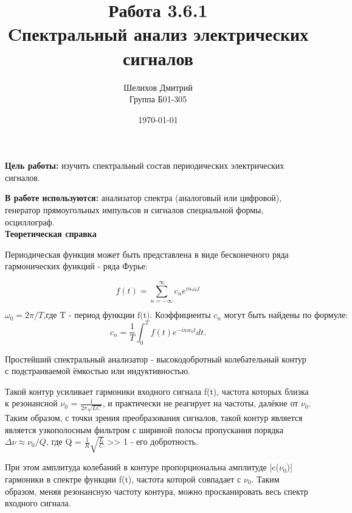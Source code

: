 \documentclass[a4paper,12pt]{article}
\author{Шелихов Дмитрий\\Группа Б01-305}
\title{\textbf{Работа 3.6.1\\Cпектральный анализ электрических сигналов}}
\date{\today}
\begin{document}
 

\maketitle

\textbf{Цель работы:} изучить спектральный состав периодических электрических сигналов.
\par
\textbf{В работе используются:} анализатор спектра (аналоговый или цифровой), генератор прямоугольных импульсов и сигналов специальной формы, осциллограф.\\
\noindent\textbf{Теоретическая справка}

Периодическая функция может быть представлена в виде бесконечного ряда гармонических функций - ряда Фурье:

$$ f(t) = \sum\limits_{n=-\infty}^{\infty} c_ne^{in\omega_0t}  $$

$$\omega_0 = 2\pi/T \text{,где T - период функции f(t). Коэффициенты {$c_n$} могут быть найдены по формуле: }$$
$$ c_n = \frac{1}{T}\int_0^Tf(t)e^{-inw_0t}dt. $$

Простейший спектральный анализатор - высокодобротный колебательный контур с подстраиваемой ёмкостью или индуктивностью.


Такой контур усиливает гармоники входного сигнала f(t), частота которых близка к резонансной $\nu_0$ = $\frac{1}{2\pi\sqrt{LC}}$, и практически не реагирует на частоты, далёкие от $\nu_0$. Таким образом, с точки зрения преобразования сигналов, такой контур является является узкополосным фильтром с шириной полосы пропускания порядка $\Delta\nu \approx \nu_0/Q$, где Q = $\frac{1}{R}\sqrt{\frac{L}{C}}$ >> 1 - его добротность.  

При этом амплитуда колебаний в контуре пропорциональна амплитуде |c($\nu_0$)| гармоники в спектре функции f(t), частота которой совпадает с $\nu_0$. Таким образом, меняя резонансную частоту контура, можно просканировать весь спектр входного сигнала. \\
\end{document}
